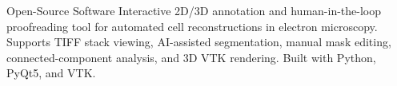 
\prefix{}
\begin{rubric}{Open-Source Software}
{Interactive 2D/3D annotation and human-in-the-loop proofreading tool for automated cell reconstructions in electron microscopy. Supports TIFF stack viewing, AI-assisted segmentation, manual mask editing, connected-component analysis, and 3D VTK rendering. Built with Python, PyQt5, and VTK.}
\end{rubric}
